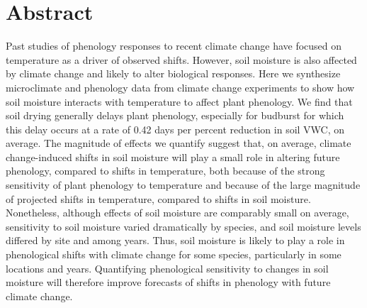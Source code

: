 \documentclass{article}
\begin{document}






\linenumbers
\section*{Abstract}
Past studies of phenology responses to recent climate change have focused on temperature as a driver of observed shifts. However, soil moisture is also affected by climate change and likely to alter biological responses. Here we synthesize microclimate and phenology data from climate change experiments to show how soil moisture interacts with temperature to affect plant phenology. We find that soil drying generally delays plant phenology, especially for budburst for which this delay occurs at a rate of 0.42 days per percent reduction in soil VWC, on average. The magnitude of effects we quantify suggest that, on average, climate change-induced shifts in soil moisture will play a small role in altering future phenology, compared to shifts in temperature, both because of the strong sensitivity of plant phenology to temperature and because of the large magnitude of projected shifts in temperature, compared to shifts in soil moisture. Nonetheless, although effects of soil moisture are comparably small on average, sensitivity to soil moisture varied dramatically by species, and soil moisture levels differed by site and among years. Thus, soil moisture is likely to play a role in phenological shifts with climate change for some species, particularly in some locations and years. Quantifying phenological sensitivity to changes in soil moisture will therefore improve forecasts of shifts in phenology with future climate change.  

\newpage
\end{document}
